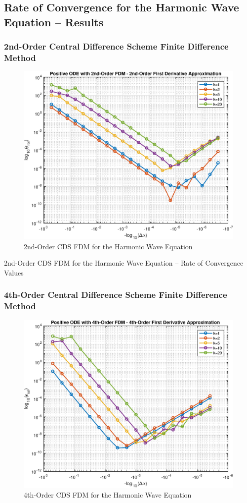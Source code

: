\documentclass[10pt]{article}		%
\numberwithin{equation}{section}
\begin{document}
\newpage

\subsection{Rate of Convergence for the Harmonic Wave Equation -- Results}

\subsubsection{2nd-Order Central Difference Scheme Finite Difference Method}

\begin{figure}[H]
	\begin{center}
		\includegraphics[width = 0.5\linewidth]{positive_ode_order_2_fd_order_2}
		\caption{2nd-Order CDS FDM for the Harmonic Wave Equation}	
	\end{center}
\end{figure}

\begin{table}[H]
	
	\caption{2nd-Order CDS FDM for the Harmonic Wave Equation -- Rate of Convergence Values}	
\end{table}

\newpage

\subsubsection{4th-Order Central Difference Scheme Finite Difference Method}

\begin{figure}[H]
	\begin{center}
		\includegraphics[width = 0.5\linewidth]{positive_ode_order_4_fd_order_4}
		\caption{4th-Order CDS FDM for the Harmonic Wave Equation}	
	\end{center}
\end{figure}
\end{document}
